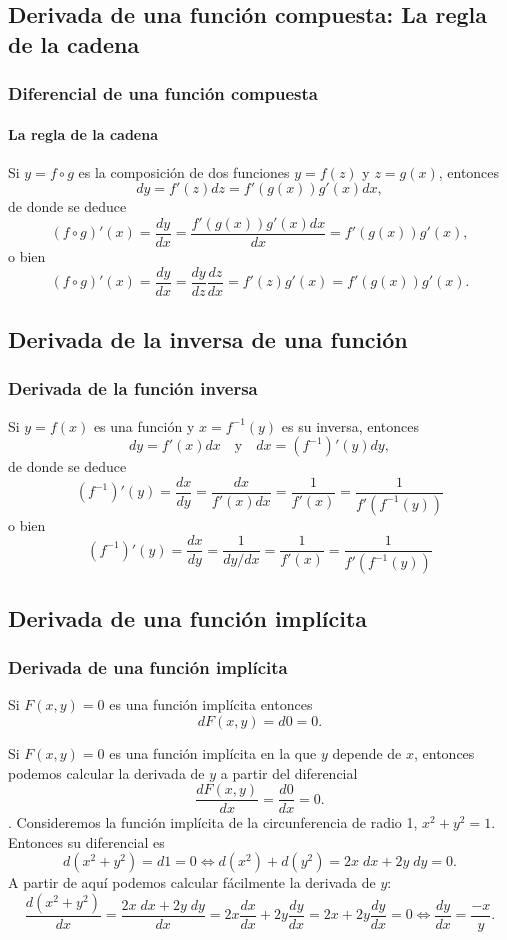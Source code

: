 \subsection{Derivada de una función compuesta: La regla de la cadena}

\begin{frame}
\frametitle{Diferencial de una función compuesta}
\framesubtitle{La regla de la cadena}
Si $y=f\circ g$ es la composición de dos funciones $y=f(z)$ y $z=g(x)$, entonces
\[dy=f'(z)dz=f'(g(x))g'(x)dx,\]
de donde se deduce
\[
(f\circ g)'(x)=\frac{dy}{dx}=\frac{f'(g(x))g'(x)dx}{dx}=f'(g(x))g'(x),
\]
o bien
\[
(f\circ g)'(x)=\frac{dy}{dx}=\frac{dy}{dz}\frac{dz}{dx}=f'(z)g'(x)=f'(g(x))g'(x).
\]
\end{frame}



\subsection{Derivada de la inversa de una función}
\begin{frame}
\frametitle{Derivada de la función inversa}
Si $y=f(x)$ es una función y $x=f^{-1}(y)$ es su inversa, entonces
\[dy=f'(x)dx \quad \textrm{y} \quad dx=\left(f^{-1}\right)'(y)dy,\]
de donde se deduce
\[
\left(f^{-1}\right)'(y)=\frac{dx}{dy}=\frac{dx}{f'(x)dx}=\frac{1}{f'(x)}=\frac{1}{f'(f^{-1}(y))}
\]
o bien
\[
\left(f^{-1}\right)'(y)=\frac{dx}{dy}=\frac{1}{dy/dx}=\frac{1}{f'(x)}=\frac{1}{f'(f^{-1}(y))}
\]
\end{frame}



\subsection{Derivada de una función implícita}
\begin{frame}
\frametitle{Derivada de una función implícita}
Si $F(x,y)=0$ es una función implícita entonces 
\[
dF(x,y)=d0=0.
\]

Si $F(x,y)=0$ es una función implícita en la que $y$ depende de $x$, entonces podemos calcular la derivada de $y$ a partir del diferencial
\[
\frac{dF(x,y)}{dx}=\frac{d0}{dx}=0.
\]
. Consideremos la función implícita de la circunferencia de radio 1, $x^2+y^2=1$. Entonces su diferencial es
\[
d(x^2+y^2)=d1=0 \Leftrightarrow d(x^2)+d(y^2)=2x\;dx+2y\;dy=0.
\]
A partir de aquí podemos calcular fácilmente la derivada de $y$:
\[
\frac{d(x^2+y^2)}{dx}= \frac{2x\;dx+2y\;dy}{dx}=2x\frac{dx}{dx}+2y\frac{dy}{dx}= 2x+2y\frac{dy}{dx}=0 \Leftrightarrow \frac{dy}{dx}=\frac{-x}{y}.
\]

\end{frame}



